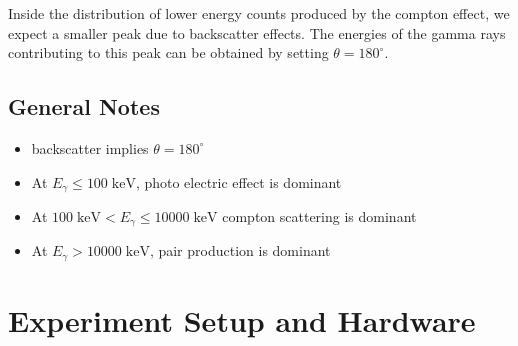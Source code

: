 \documentclass[a4paper]{article}
\begin{document}
Inside the distribution of lower energy counts produced by the compton effect, we expect a smaller peak due to backscatter effects. The energies of the gamma rays contributing to this peak can be obtained by setting $\theta=180^{\circ}$.

\subsection{General Notes}

\begin{itemize}
    \item backscatter implies $\theta=180^{\circ}$
    \item At $E_{\gamma}\leq100\mathrm{\;keV}$, photo electric effect is dominant
    \item At $100\mathrm{\;keV}<E_{\gamma}\leq10000\mathrm{\;keV}$ compton scattering is dominant
    \item At $E_{\gamma}>10000\mathrm{\;keV}$, pair production is dominant
\end{itemize}

\section{Experiment Setup and Hardware}
\end{document}
